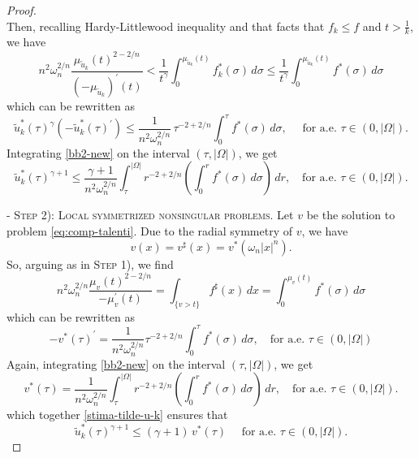 \documentclass[11pt,a4paper]{amsart}
\theoremstyle{definition}
\theoremstyle{plain}
\numberwithin{equation}{section}
\begin{document}
{\begin{proof}
\begin{equation}
\end{equation}
Then, recalling Hardy-Littlewood inequality and 
that facts that $f_k \leq f$ and $t>\frac 1k$, we have
$$
n^2 \omega_n^{2 / n} \frac{\mu_{\tilde{u}_k}(t)^{2-2 / n}}{\left(-\mu_{\tilde{u}_k}\right)^{\prime}(t)} %
<\frac{1}{t^\gamma} \int_0^{\mu_{\tilde{u}_k}(t)} f_k^\ast(\sigma) \,d \sigma 
\leq \frac{1}{t^\gamma} \int_0^{\mu_{\tilde{u}_k}(t)} f^\ast(\sigma) \,d \sigma
$$
which can be rewritten as 
\begin{equation}\label{bb2-new}
\tilde{u}_k^\ast(\tau)^\gamma\left(-\tilde{u}_k^\ast(\tau)^{\prime}\right) \leq \frac{1}{n^2 \omega_n^{2 / n}} \,\tau^{-2+2 / n} \int_0^\tau f^\ast(\sigma) \,d\sigma, \quad \text { for a.e. } \tau \in(0,|\Omega|).
\end{equation}
Integrating \eqref{bb2-new} on the interval $(\tau,|\Omega|)$, we get
\begin{equation}\label{stima-tilde-u-k}
\tilde{u}_k^\ast(\tau)^{\gamma+1} \leq \frac{\gamma+1}{n^2 \omega_n^{2 / n}} \int_\tau^{|\Omega|} r^{-2+2 / n}\left(\int_0^r f^\ast(\sigma) \,d \sigma\right) \,d r, \quad\text{for a.e. } \tau\in(0,|\Omega|).
\end{equation}

-\,\,\textsc{Step 2): Local symmetrized nonsingular problems.} Let $v$ be the solution to problem \eqref{eq:comp-talenti}. Due to the radial symmetry of $v$, we have 
$$v(x)=v^\sharp(x)=v^*(\omega_n|x|^n).$$
So, arguing as in \textsc{Step 1)}, we find
\begin{equation*}
n^2 \omega_n^{2 / n} \dfrac{\mu_{v}(t)^{2-2/n}}{-\mu_{v}^{\prime}(t)} =\int_{\{v>t\}} f^\sharp(x)\,d x=\int_0^{\mu_v(t)}f^\ast(\sigma)\, d\sigma
\end{equation*}
which can be rewritten as
$$
-v^\ast(\tau)^{\prime} =\frac{1}{n^2 \omega_n^{2 / n}} \tau^{-2+2 / n} \int_0^\tau f^\ast(\sigma) \,d\sigma, \quad \text {for a.e. } \tau \in(0,|\Omega|)
$$
Again, integrating \eqref{bb2-new} on the interval $(\tau,|\Omega|)$, we get
\begin{equation}\label{eq-v}
v^\ast(\tau)= \frac{1}{n^2 \omega_n^{2 / n}} \int_\tau^{|\Omega|} r^{-2+2 / n}\left(\int_0^r f^\ast(\sigma) \,d \sigma\right) \,d r, \quad\text{for a.e. } \tau\in(0,|\Omega|).
\end{equation}
which together \eqref{stima-tilde-u-k} ensures that 
\begin{equation}\label{stima-punt-u-k}
    \tilde u_k^\ast(\tau)^{\gamma+1}\leq (\gamma+1)\,v^\ast(\tau)\quad \text{ for a.e. }\tau \in(0,|\Omega|).
\end{equation}


\end{proof}}
\end{document}
